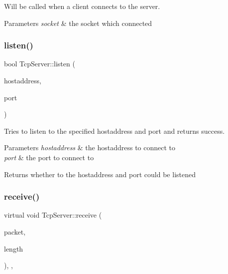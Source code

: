 Will be called when a client connects to the server. 


\begin{DoxyParams}{Parameters}
{\em socket} & the socket which connected \\
\hline
\end{DoxyParams}
\mbox{\label{class_tcp_server_a91c1c56fff64ace30c2622d0d939807e}} 
\subsubsection{\texorpdfstring{listen()}{listen()}}
{\footnotesize\ttfamily bool Tcp\+Server\+::listen (\begin{DoxyParamCaption}\item[{const A\+String \&}]{hostaddress,  }\item[{ushort}]{port }\end{DoxyParamCaption})\hspace{0.3cm}{\ttfamily [virtual]}}



Tries to listen to the specified hostaddress and port and returns success. 


\begin{DoxyParams}{Parameters}
{\em hostaddress} & the hostaddress to connect to \\
\hline
{\em port} & the port to connect to \\
\hline
\end{DoxyParams}
\begin{DoxyReturn}{Returns}
whether to the hostaddress and port could be listened 
\end{DoxyReturn}
\mbox{\label{class_tcp_server_a4a506d4903c2a5ef92ed1ef5542fdedb}} 
\subsubsection{\texorpdfstring{receive()}{receive()}}
{\footnotesize\ttfamily virtual void Tcp\+Server\+::receive (\begin{DoxyParamCaption}\item[{const char $\ast$}]{packet,  }\item[{uint}]{length }\end{DoxyParamCaption})\hspace{0.3cm}{\ttfamily [override]}, {\ttfamily [protected]}, {}}



